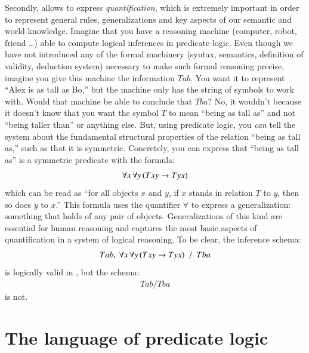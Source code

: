 \documentclass[nobib,nofonts]{tufte-handout}
\newcommand{\predlog}{\acro{PredLog}}
\begin{document}
Secondly, \predlog allows to express \emph{quantification}, which is extremely important in order to represent general rules, generalizations and key aspects of our semantic and world knowledge.
Imagine that you have a reasoning machine (computer, robot, friend \dots) able to compute logical inferences in predicate logic.
Even though we have not introduced any of the formal machinery (syntax, semantics, definition of validity, deduction system) necessary to make such formal reasoning precise, imagine you give this machine the information $Tab$.
You want it to represent ``Alex is as tall as Bo,'' but the machine only has the string of symbols to work with.
Would that machine be able to conclude that $Tba$?
No, it wouldn't because it doesn't know that you want the symbol $T$ to mean ``being as tall as'' and not ``being taller than'' or anything else.
But, using predicate logic, you \emph{can} tell the system about the fundamental structural properties of the relation ``being as tall as,'' such as that it is symmetric.
Concretely, you can express that ``being as tall as'' is a symmetric predicate with the \predlog formula:
\begin{align*}
 \forall x \thinspace \forall y \thinspace (Txy \rightarrow Tyx)
\end{align*}
which can be read as ``for all objects $x$ and $y$, if $x$ stands in relation $T$ to $y$, then so does $y$ to $x$.''
This formula uses the quantifier \(\forall\) to express a generalization: something that holds of any pair of objects.
Generalizations of this kind are essential for human reasoning and \predlog captures the most basic aspects of quantification in a system of logical reasoning.
To be clear, the inference schema:
\begin{align*}
 Tab, \ \forall x \myts \forall y \myts (Txy \rightarrow Tyx) \ \ / \ \ Tba
\end{align*}
is logically valid in \predlog, but the schema:
\begin{align*}
 Tab / Tba
\end{align*}
is not.

\section{The language of predicate logic}
\end{document}
